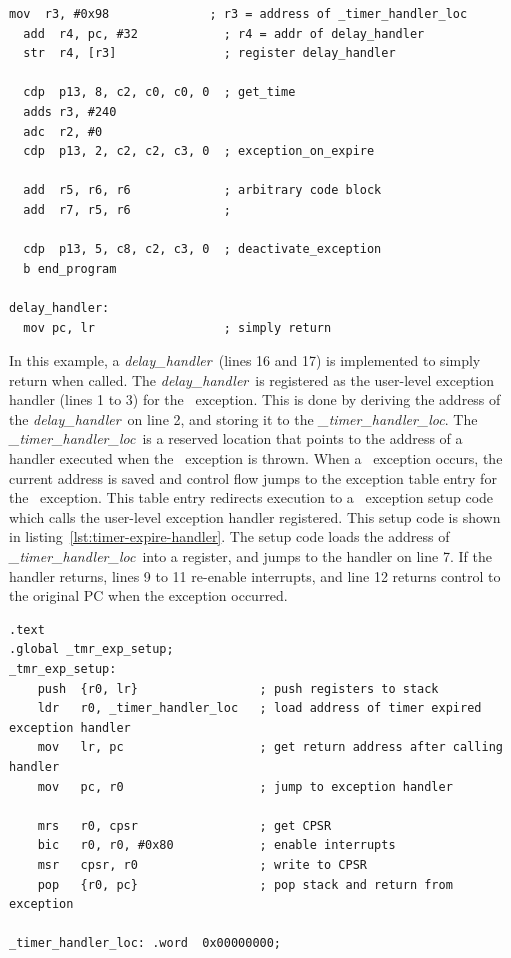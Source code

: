 \begin{lstlisting}[float=h, label=lst:exception-sample,caption=Sample code that triggers a \timerexpired\ exception ]
  mov  r3, #0x98              ; r3 = address of _timer_handler_loc 
  add  r4, pc, #32            ; r4 = addr of delay_handler
  str  r4, [r3]               ; register delay_handler
  
  cdp  p13, 8, c2, c0, c0, 0  ; get_time
  adds r3, #240
  adc  r2, #0
  cdp  p13, 2, c2, c2, c3, 0  ; exception_on_expire
  
  add  r5, r6, r6             ; arbitrary code block
  add  r7, r5, r6             ;
  
  cdp  p13, 5, c8, c2, c3, 0  ; deactivate_exception
  b end_program                       
  
delay_handler:
  mov pc, lr                  ; simply return
\end{lstlisting}

\newcommand{\delayhandler}{\emph{delay\_handler}}
\newcommand{\Delayhandler}{\emph{Delay\_handler}}
\newcommand{\timerhandlerloc}{\emph{\_timer\_handler\_loc}}

In this example, a \delayhandler\ (lines 16 and 17) is implemented to simply return when called.
The \delayhandler\ is registered as the user-level exception handler (lines 1 to 3) for the \timerexpired\ exception.
This is done by deriving the address of the \delayhandler\ on line 2, and storing it to the \timerhandlerloc.
The \timerhandlerloc\ is a reserved location that points to the address of a handler executed when the \timerexpired\ exception is thrown.
When a \timerexpired\ exception occurs, the current address is saved and control flow jumps to the exception table entry for the \timerexpired\ exception.
This table entry redirects execution to a \timerexpired\ exception setup code which calls the user-level exception handler registered.
This setup code is shown in listing~\ref{lst:timer-expire-handler}.
The setup code loads the address of \timerhandlerloc\ into a register, and jumps to the handler on line 7.
If the handler returns, lines 9 to 11 re-enable interrupts, and line 12 returns control to the original PC when the exception occurred.  
\begin{lstlisting}[float=h, label=lst:timer-expire-handler,caption=The \timerexpired\ exception setup code]
.text
.global _tmr_exp_setup;
_tmr_exp_setup:
    push  {r0, lr}                 ; push registers to stack
    ldr   r0, _timer_handler_loc   ; load address of timer expired exception handler
    mov   lr, pc                   ; get return address after calling handler    
    mov   pc, r0                   ; jump to exception handler
    
    mrs   r0, cpsr                 ; get CPSR 
    bic   r0, r0, #0x80            ; enable interrupts
    msr   cpsr, r0                 ; write to CPSR
    pop   {r0, pc}                 ; pop stack and return from exception

_timer_handler_loc: .word  0x00000000;
\end{lstlisting}

